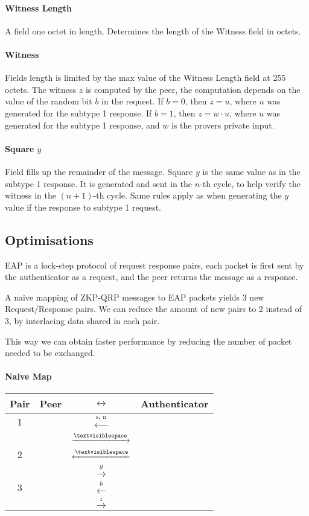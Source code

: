 \paragraph{Witness Length} A field one octet in length. Determines the length of the Witness field in octets.

\paragraph{Witness} Fields length is limited by the max value of the Witness Length field at 255 octets.
The witness $z$ is computed by the peer, the computation depends on the value of the random bit $b$ in the request.
If $b=0$, then $z = u$, where $u$ was generated for the subtype 1 response. %
If $b=1$, then $z = w \cdot u$,  where $u$ was generated for the subtype 1 response, and $w$ is the provers private input.

\paragraph{Square $y$} Field fills up the remainder of the message. 
Square $y$ is the same value as in the subtype 1 response.
It is generated and sent in the $n$-th cycle, to help verify the witness in the $(n+1)$-th cycle.
Same rules apply as when generating the $y$ value if the response to subtype 1 request.

\subsection{Optimisations}
EAP is a lock-step protocol of request response pairs, each packet is first sent by the authenticator as a request, and the peer returns the message as a response. %

A naive mapping of ZKP-QRP messages to EAP packets yields 3 new Request/Response pairs. 
We can reduce the amount of new pairs to 2 instead of 3, by interlacing data shared in each pair.

This way we can obtain faster performance by reducing the number of packet needed to be exchanged.

\paragraph{Naive Map}

\begin{center}
	\begin{tabular}{c|rcl}
	Pair & Peer  & $\leftrightarrow$ & Authenticator \\
	\hline
	1 & & $\xleftarrow{\text{s, n}}$ &\\
	&& $\xrightarrow{\textvisiblespace}$&\\
	\hline
	2 & & $\xleftarrow{\textvisiblespace}$&\\
	&& $\xrightarrow{y}$&\\
	\hline
	3 & & $\xleftarrow{b}$&\\
	&& $\xrightarrow{z}$&\\
	\hline
	\end{tabular}
\end{center}

